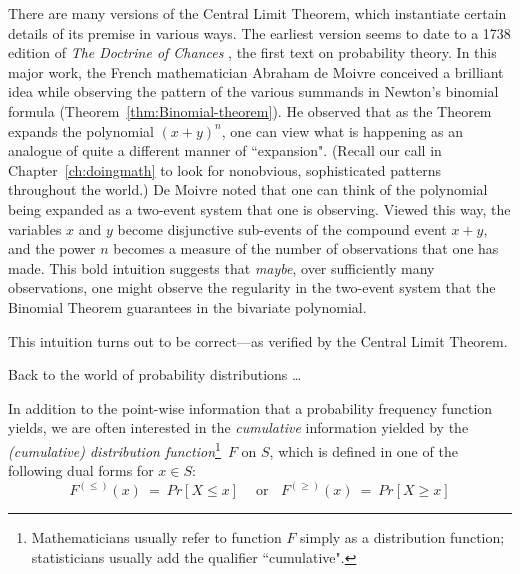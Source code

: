 \bigskip


There are many versions of the Central Limit Theorem, which instantiate certain details of its premise in various ways.  The earliest version seems to date to a 1738 edition of {\it The Doctrine of Chances} \cite{DeMoivre}, the first text on probability theory.  In this major work, the French mathematician Abraham de Moivre conceived a brilliant idea while observing the pattern of the various summands in Newton's binomial formula (Theorem~\ref{thm:Binomial-theorem}).  He observed that as the Theorem expands the polynomial $(x+y)^n$, one can view what is happening as an analogue of quite a different manner of ``expansion".  (Recall our call in Chapter~\ref{ch:doingmath} to look for nonobvious, sophisticated patterns throughout the world.)  De Moivre noted that one can think of the polynomial being expanded as a two-event system that one is observing.  Viewed this way, the variables $x$ and $y$ become disjunctive sub-events of the compound event $x+y$, and the power $n$ becomes a measure of the number of observations that one has made.  This bold intuition suggests that {\em maybe}, over sufficiently many observations, one might observe the regularity in the two-event system that the Binomial Theorem guarantees in the bivariate polynomial.

\smallskip

\noindent
This intuition turns out to be correct---as verified by the Central Limit Theorem.

\bigskip

\noindent Back to the world of probability distributions \ldots

\medskip

 

In addition to the point-wise information that a probability frequency function yields, we are
often interested in the {\em cumulative} information yielded by the {\it (cumulative) distribution function}\footnote{Mathematicians usually refer to function $F$ simply as a distribution function; statisticians usually add the qualifier ``cumulative".}~$F$ on $S$, which is defined in one of the following dual forms for $x \in S$:
\[ F^{(\leq)}(x) \ = \ Pr[X \leq x] \ \ \ \ \mbox{ or} \ \ \ \  F^{(\geq)}(x) \ = \ Pr[X \geq x]\]

\smallskip

